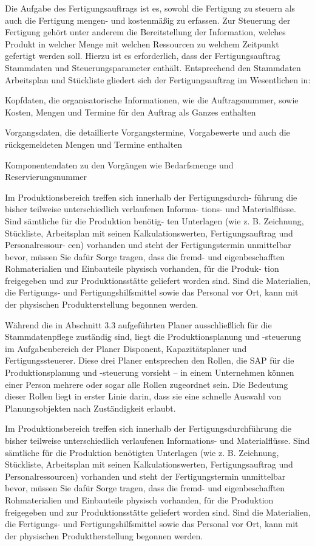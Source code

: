 Die Aufgabe des Fertigungsauftrags ist es, sowohl die Fertigung zu steuern als auch die Fertigung mengen- und kostenmäßig zu erfassen. Zur Steuerung der Fertigung gehört unter anderem die Bereitstellung der Information, welches Produkt in welcher Menge mit welchen Ressourcen zu welchem Zeitpunkt gefertigt werden soll. Hierzu ist es erforderlich, dass der Fertigungsauftrag Stammdaten und Steuerungsparameter enthält. Entsprechend den Stammdaten Arbeitsplan und Stückliste gliedert sich der Fertigungsauftrag im Wesentlichen in:

Kopfdaten, die organisatorische Informationen, wie die Auftragsnummer, sowie Kosten, Mengen und Termine für den Auftrag als Ganzes enthalten 

Vorgangsdaten, die detaillierte Vorgangstermine, Vorgabewerte und auch die rückgemeldeten Mengen und Termine enthalten 

Komponentendaten zu den Vorgängen wie Bedarfsmenge und Reservierungsnummer

Im Produktionsbereich treffen sich innerhalb der Fertigungsdurch- führung die bisher teilweise unterschiedlich verlaufenen Informa- tions- und Materialflüsse. Sind sämtliche für die Produktion benötig- ten Unterlagen (wie z. B. Zeichnung, Stückliste, Arbeitsplan mit seinen Kalkulationswerten, Fertigungsauftrag und Personalressour- cen) vorhanden und steht der Fertigungstermin unmittelbar bevor, müssen Sie dafür Sorge tragen, dass die fremd- und eigenbeschafften Rohmaterialien und Einbauteile physisch vorhanden, für die Produk- tion freigegeben und zur Produktionsstätte geliefert worden sind. Sind die Materialien, die Fertigungs- und Fertigungshilfsmittel sowie das Personal vor Ort, kann mit der physischen Produkterstellung begonnen werden.

Während die in Abschnitt 3.3 aufgeführten Planer ausschließlich für die Stammdatenpflege zuständig sind, liegt die Produktionsplanung und -steuerung im Aufgabenbereich der Planer Disponent, Kapazitätsplaner und Fertigungssteuerer. Diese drei Planer entsprechen den Rollen, die SAP für die Produktionsplanung und -steuerung vorsieht – in einem Unternehmen können einer Person mehrere oder sogar alle Rollen zugeordnet sein. Die Bedeutung dieser Rollen liegt in erster Linie darin, dass sie eine schnelle Auswahl von Planungsobjekten nach Zuständigkeit erlaubt.

Im Produktionsbereich treffen sich innerhalb der Fertigungsdurchführung die bisher teilweise unterschiedlich verlaufenen Informations- und Materialflüsse. Sind sämtliche für die Produktion benötigten Unterlagen (wie z. B. Zeichnung, Stückliste, Arbeitsplan mit seinen Kalkulationswerten, Fertigungsauftrag und Personalressourcen) vorhanden und steht der Fertigungstermin unmittelbar bevor, müssen Sie dafür Sorge tragen, dass die fremd- und eigenbeschafften Rohmaterialien und Einbauteile physisch vorhanden, für die Produktion freigegeben und zur Produktionsstätte geliefert worden sind. Sind die Materialien, die Fertigungs- und Fertigungshilfsmittel sowie das Personal vor Ort, kann mit der physischen Produktherstellung begonnen werden.


